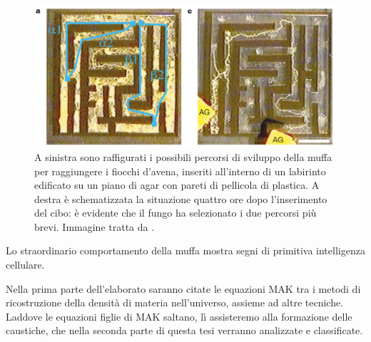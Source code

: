 \begin{center}
	\begin{figure}[H]
		\centering
		\includegraphics[scale=0.3, angle=0]{yamada.png}
		\caption{A sinistra sono raffigurati i possibili percorsi di sviluppo della muffa per raggiungere i fiocchi d'avena, inseriti all'interno 
		di un labirinto edificato su un piano di agar con pareti di pellicola di plastica. A destra	è schematizzata la situazione quattro ore dopo
		l'inserimento del cibo: è evidente che il fungo ha selezionato i due percorsi più brevi. Immagine tratta da \cite{yamada}.}
		\label{fig:yamada}
	\end{figure}
\end{center}
Lo straordinario comportamento della muffa mostra segni di primitiva intelligenza cellulare.

Nella prima parte dell'elaborato saranno citate le equazioni MAK tra i metodi di ricostruzione della densità di materia
nell'universo, assieme ad altre tecniche. Laddove le equazioni figlie di MAK saltano, lì assisteremo alla 
formazione delle caustiche, che nella seconda parte di questa tesi verranno analizzate e classificate.